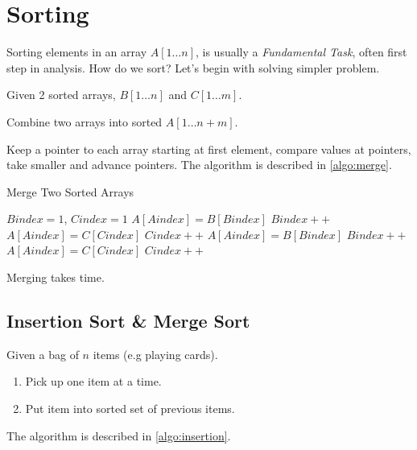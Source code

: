 \section{Sorting}
Sorting elements in an array $A[1 \ldots n]$,
is usually a \emph{Fundamental Task}, often first step in analysis.
How do we sort?
Let's begin with solving simpler problem.

\AlgoInput Given 2 sorted arrays, $B[1 \ldots n]$ and $C[1 \ldots m]$.

\AlgoOutput Combine two arrays into sorted $A[1 \ldots n+m]$.

\solution

Keep a pointer to each array starting at first element,
compare values at pointers, take smaller and advance pointers.
The algorithm is described in \cref{algo:merge}.

\begin{algorithm}[H]
    \caption{Merge Two Sorted Arrays}\label{algo:merge}
    \begin{algorithmic}[1]
            \State $Bindex = 1$, $Cindex = 1$
                    \State $A[Aindex] = B[Bindex]$
                    \State $Bindex++$
                    \State $A[Aindex] = C[Cindex]$
                    \State $Cindex++$
                    \State $A[Aindex] = B[Bindex]$
                    \State $Bindex++$
                \Else {}
                    \State $A[Aindex] = C[Cindex]$
                    \State $Cindex++$
                \EndIf
            \EndFor
        \EndProcedure
    \end{algorithmic}
\end{algorithm}

Merging takes  time.

\subsection{Insertion Sort \& Merge Sort}
Given a bag of $n$ items (e.g playing cards).
\begin{enumerate}
    \item Pick up one item at a time.
    \item Put item into sorted set of previous items.
\end{enumerate}
The algorithm is described in \cref{algo:insertion}.

